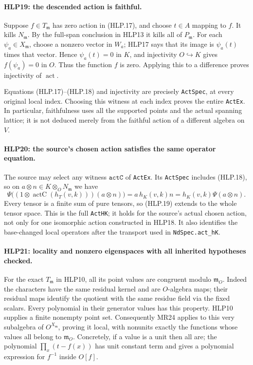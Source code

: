 \paragraph{HLP19: the descended action is faithful.}
\label{claim:HLP19}
Suppose \(f\in T_{\mathfrak m}\) has zero action in (HLP.17),
and choose \(t\in A\) mapping to \(f\). It kills
\(N_{\mathfrak m}\). By the full-span conclusion in HLP13 it
kills all of \(P_{\mathfrak m}\). For each
\(\psi_a\in X_{\mathfrak m}\), choose a nonzero vector in
\(W_a\); HLP17 says that its image is \(\psi_a(t)\) times that
vector. Hence \(\psi_a(t)=0\) in \(K\), and injectivity
\(O\hookrightarrow K\) gives \(f(\psi_a)=0\) in \(O\).
Thus the function \(f\) is zero. Applying this to a difference
proves injectivity of \(\operatorname{act}\).

Equations (HLP.17)--(HLP.18) and injectivity are precisely
\texttt{ActSpec}, at every original local index. Choosing this
witness at each index proves the entire \texttt{ActEx}. In
particular, faithfulness uses all the supported points and the
actual spanning lattice; it is not deduced merely from the
faithful action of a different algebra on \(V\).

\paragraph{HLP20: the source's chosen action satisfies the same operator equation.}
\label{claim:HLP20}
The source may select any witness \(\texttt{actC}\) of
\texttt{ActEx}. Its \texttt{ActSpec} includes (HLP.18), so on
\(a\otimes n\in K\otimes_ON_{\mathfrak m}\) we have
\[
 \Psi\bigl((1\otimes\operatorname{actC}(h_T(v,k)))(a\otimes n)\bigr)
       =a\,h_K(v,k)n
       =h_K(v,k)\Psi(a\otimes n).                   \tag{HLP.19}
\]
Every tensor is a finite sum of pure tensors, so (HLP.19) extends
to the whole tensor space. This is the full \texttt{ActHK}; it
holds for the source's actual chosen action, not only for one
isomorphic action constructed in HLP18. It also identifies the
base-changed local operators after the transport used in
\texttt{NdSpec.act\_hK}.

\paragraph{HLP21: locality and nonzero eigenspaces with all inherited hypotheses checked.}
\label{claim:HLP21}
For the exact \(T_{\mathfrak m}\) in HLP10, all its point values
are congruent modulo \(\mathfrak m_O\). Indeed the characters
have the same residual kernel and are \(O\)-algebra maps; their
residual maps identify the quotient with the same residue field
via the fixed scalars. Every polynomial in their generator values
has this property. HLP10 supplies a finite nonempty point set.
Consequently MR24 applies to this very subalgebra of
\(O^{X_{\mathfrak m}}\), proving it local, with nonunits exactly
the functions whose values all belong to \(\mathfrak m_O\).
Concretely, if a value is a unit then all are; the polynomial
\(\prod_x(t-f(x))\) has unit constant term and gives a polynomial
expression for \(f^{-1}\) inside \(O[f]\).


